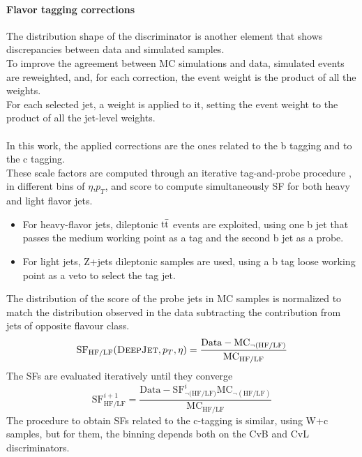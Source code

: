 \paragraph*{Flavor tagging corrections}
The distribution shape of the \DeepJet discriminator is another element that shows discrepancies between data and simulated samples.\\
To improve the agreement between MC simulations and data, simulated events are reweighted, and, for each correction, the event weight is the product of all the weights.\\
For each selected jet, a weight is applied to it, setting the event weight to the product of all the jet-level weights.
\\
\\
In this work, the applied corrections are the ones related to the b tagging and to the c tagging.\\
These scale factors are computed through an iterative tag-and-probe procedure \cite{2021B-tagging2018.}, in different bins of $\eta$,$p_T$, and \DeepJet score to compute simultaneously SF for both heavy and light flavor jets.
\begin{itemize}
    \item For heavy-flavor jets, dileptonic ${{\text{t}}{\bar{\text{t}}}}$ events are exploited, using one b jet that passes the medium working point as a tag and the second b jet as a probe.
    \item For light jets, Z+jets dileptonic samples are used, using a b tag loose working point as a veto to select the tag jet.
\end{itemize}
The distribution of the \DeepJet score of the probe jets in MC samples is normalized to match the distribution observed in the data subtracting the contribution from jets of opposite flavour class.
\begin{equation}
    \text{SF}_{\text{HF/LF}} ({\textsc{DeepJet}},p_T,\eta)=\frac{\text{Data}-\text{MC}_{\neg(\text{HF/LF})}}{\text{MC}_{\text{HF/LF}}}
\end{equation}
The SFs are evaluated iteratively until they converge
\begin{equation}
    \text{SF}_{\text{HF/LF}}^{i+1} =\dfrac{\text{Data}-\text{SF}_{\neg (\text{HF/LF)}}^{i} \text{MC}_{\neg(\text{HF/LF})}}{\text{MC}_{\text{HF/LF}}}
\end{equation}
The procedure to obtain SFs related to the c-tagging is similar, using W+c samples, but for them, the binning depends both on the CvB and CvL discriminators.



